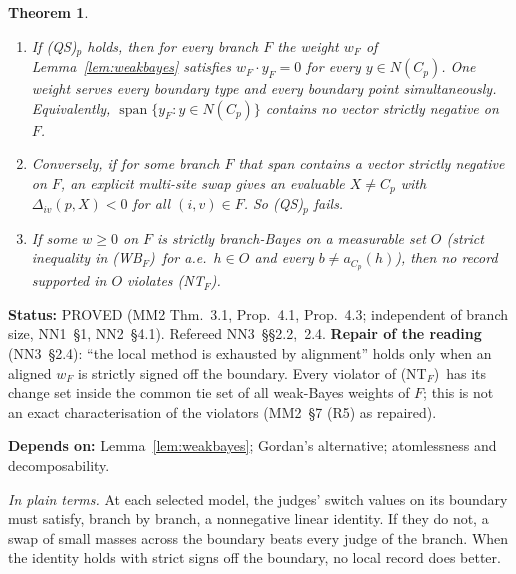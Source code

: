 \documentclass[11pt]{article}
\newtheorem{theorem}{Theorem}[section]
\theoremstyle{definition}
\theoremstyle{remark}
\newcommand{\spn}{\operatorname{span}}
\newcommand{\src}[1]{\textsf{#1}}
\newcommand{\status}[1]{\par\smallskip\noindent\textbf{Status:} #1\par}
\newcommand{\deps}[1]{\noindent\textbf{Depends on:} #1\par}
\newcommand{\inwords}[1]{\noindent\textit{In plain terms.} #1\par\smallskip}
\newcommand{\QS}{\textup{(QS)}}
\newcommand{\NT}{\textup{(NT$_F$)}}
\newcommand{\WB}{\textup{(WB$_F$)}}
\begin{document}
\begin{theorem}\label{thm:alignment}
\begin{enumerate}[label=(\alph*)]
\item If \QS$_p$ holds, then for every branch $F$ the weight $w_F$ of Lemma~\ref{lem:weakbayes} satisfies $w_F\cdot y_F=0$ for every $y\in N(C_p)$. One weight serves every boundary type and every boundary point simultaneously. Equivalently, $\spn\{y_F:y\in N(C_p)\}$ contains no vector strictly negative on $F$.
\item Conversely, if for some branch $F$ that span contains a vector strictly negative on $F$, an explicit multi-site swap gives an evaluable $X\ne C_p$ with $\Delta_{iv}(p,X)<0$ for all $(i,v)\in F$. So \QS$_p$ fails.
\item If some $w\ge0$ on $F$ is strictly branch-Bayes on a measurable set $O$ (strict inequality in \WB\ for a.e.\ $h\in O$ and every $b\ne a_{C_p}(h)$), then no record supported in $O$ violates \NT.
\end{enumerate}
\end{theorem}
\status{PROVED (\src{MM2} Thm.~3.1, Prop.~4.1, Prop.~4.3; independent of branch size, \src{NN1}~\S1, \src{NN2}~\S4.1). Refereed \src{NN3}~\S\S2.2,~2.4. \textbf{Repair of the reading} (\src{NN3}~\S2.4): ``the local method is exhausted by alignment'' holds only when an aligned $w_F$ is strictly signed off the boundary. Every violator of \NT\ has its change set inside the common tie set of all weak-Bayes weights of $F$; this is not an exact characterisation of the violators (\src{MM2}~\S7 (R5) as repaired).}
\deps{Lemma~\ref{lem:weakbayes}; Gordan's alternative; atomlessness and decomposability.}
\inwords{At each selected model, the judges' switch values on its boundary must satisfy, branch by branch, a nonnegative linear identity. If they do not, a swap of small masses across the boundary beats every judge of the branch. When the identity holds with strict signs off the boundary, no local record does better.}
\end{document}
